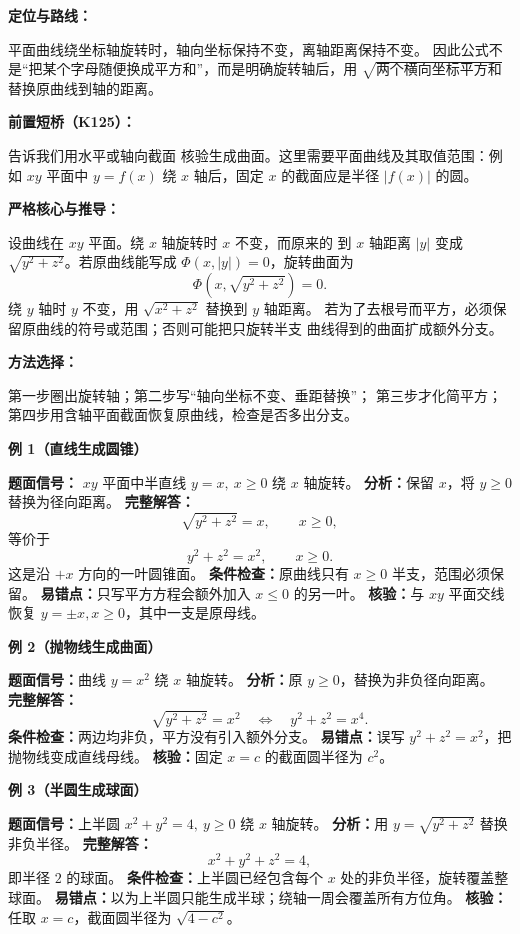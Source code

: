 \begin{knowledgeBox}
\textbf{定位与路线：}

平面曲线绕坐标轴旋转时，轴向坐标保持不变，离轴距离保持不变。
因此公式不是“把某个字母随便换成平方和”，而是明确旋转轴后，用
\(\sqrt{\text{两个横向坐标平方和}}\) 替换原曲线到轴的距离。

\textbf{前置短桥（K125）：}

告诉我们用水平或轴向截面
核验生成曲面。这里需要平面曲线及其取值范围：例如 \(xy\) 平面中
\(y=f(x)\) 绕 \(x\) 轴后，固定 \(x\) 的截面应是半径 \(|f(x)|\) 的圆。

\textbf{严格核心与推导：}

设曲线在 \(xy\) 平面。绕 \(x\) 轴旋转时 \(x\) 不变，而原来的
到 \(x\) 轴距离 \(|y|\) 变成 \(\sqrt{y^2+z^2}\)。若原曲线能写成
\(\Phi(x,|y|)=0\)，旋转曲面为
\[
\Phi\!\left(x,\sqrt{y^2+z^2}\right)=0.
\]
绕 \(y\) 轴时 \(y\) 不变，用 \(\sqrt{x^2+z^2}\) 替换到 \(y\) 轴距离。
若为了去根号而平方，必须保留原曲线的符号或范围；否则可能把只旋转半支
曲线得到的曲面扩成额外分支。

\textbf{方法选择：}

第一步圈出旋转轴；第二步写“轴向坐标不变、垂距替换”；
第三步才化简平方；第四步用含轴平面截面恢复原曲线，检查是否多出分支。

\textbf{例 1（直线生成圆锥）}

\textbf{题面信号：} \(xy\) 平面中半直线 \(y=x,\ x\ge0\) 绕 \(x\) 轴旋转。
\textbf{分析：}保留 \(x\)，将 \(y\ge0\) 替换为径向距离。
\textbf{完整解答：}
\[
\sqrt{y^2+z^2}=x,\qquad x\ge0,
\]
等价于
\[
y^2+z^2=x^2,\qquad x\ge0.
\]
这是沿 \(+x\) 方向的一叶圆锥面。
\textbf{条件检查：}原曲线只有 \(x\ge0\) 半支，范围必须保留。
\textbf{易错点：}只写平方方程会额外加入 \(x\le0\) 的另一叶。
\textbf{核验：}与 \(xy\) 平面交线恢复 \(y=\pm x,x\ge0\)，其中一支是原母线。

\textbf{例 2（抛物线生成曲面）}

\textbf{题面信号：}曲线 \(y=x^2\) 绕 \(x\) 轴旋转。
\textbf{分析：}原 \(y\ge0\)，替换为非负径向距离。
\textbf{完整解答：}
\[
\sqrt{y^2+z^2}=x^2
\quad\Longleftrightarrow\quad
y^2+z^2=x^4.
\]
\textbf{条件检查：}两边均非负，平方没有引入额外分支。
\textbf{易错点：}误写 \(y^2+z^2=x^2\)，把抛物线变成直线母线。
\textbf{核验：}固定 \(x=c\) 的截面圆半径为 \(c^2\)。

\textbf{例 3（半圆生成球面）}

\textbf{题面信号：}上半圆 \(x^2+y^2=4,\ y\ge0\) 绕 \(x\) 轴旋转。
\textbf{分析：}用 \(y=\sqrt{y^2+z^2}\) 替换非负半径。
\textbf{完整解答：}
\[
x^2+y^2+z^2=4,
\]
即半径 \(2\) 的球面。
\textbf{条件检查：}上半圆已经包含每个 \(x\) 处的非负半径，旋转覆盖整球面。
\textbf{易错点：}以为上半圆只能生成半球；绕轴一周会覆盖所有方位角。
\textbf{核验：}任取 \(x=c\)，截面圆半径为 \(\sqrt{4-c^2}\)。


\end{knowledgeBox}
